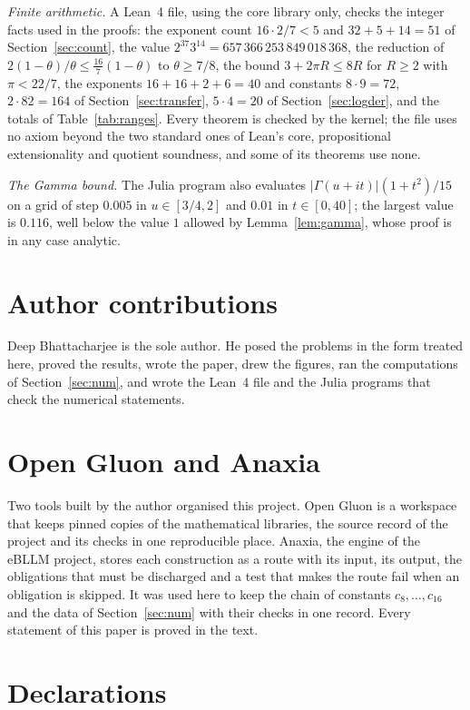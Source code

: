 \documentclass[11pt,a4paper,reqno]{amsart}
\theoremstyle{remark}
\numberwithin{equation}{section}
\begin{document}
\emph{Finite arithmetic.} A Lean~4 file, using the core library only, checks the integer facts used in the proofs: the exponent count $16\cdot2/7<5$ and $32+5+14=51$ of Section~\ref{sec:count}, the value $2^{37}3^{14}=657\,366\,253\,849\,018\,368$, the reduction of $2(1-\theta)/\theta\le\frac{16}7(1-\theta)$ to $\theta\ge7/8$, the bound $3+2\pi R\le8R$ for $R\ge2$ with $\pi<22/7$, the exponents $16+16+2+6=40$ and constants $8\cdot9=72$, $2\cdot82=164$ of Section~\ref{sec:transfer}, $5\cdot4=20$ of Section~\ref{sec:logder}, and the totals of Table~\ref{tab:ranges}. Every theorem is checked by the kernel; the file uses no axiom beyond the two standard ones of Lean's core, propositional extensionality and quotient soundness, and some of its theorems use none.

\emph{The Gamma bound.} The Julia program also evaluates $|\Gamma(u+it)|(1+t^2)/15$ on a grid of step $0.005$ in $u\in[3/4,2]$ and $0.01$ in $t\in[0,40]$; the largest value is $0.116$, well below the value $1$ allowed by Lemma~\ref{lem:gamma}, whose proof is in any case analytic.
\section*{Author contributions}
Deep Bhattacharjee is the sole author. He posed the problems in the form treated here, proved the results, wrote the paper, drew the figures, ran the computations of Section~\ref{sec:num}, and wrote the Lean~4 file and the Julia programs that check the numerical statements.

\section*{Open Gluon and Anaxia}
Two tools built by the author organised this project. Open Gluon is a workspace that keeps pinned copies of the mathematical libraries, the source record of the project and its checks in one reproducible place. Anaxia, the engine of the eBLLM project, stores each construction as a route with its input, its output, the obligations that must be discharged and a test that makes the route fail when an obligation is skipped. It was used here to keep the chain of constants $c_8,\dots,c_{16}$ and the data of Section~\ref{sec:num} with their checks in one record. Every statement of this paper is proved in the text.

\section*{Declarations}
\end{document}
